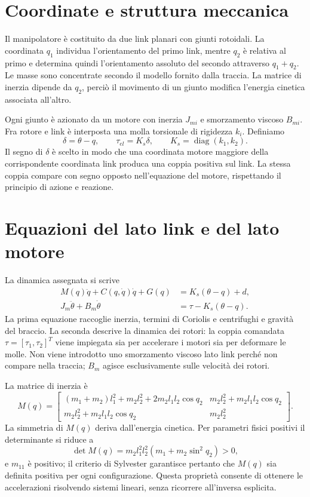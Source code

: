 \documentclass[11pt,a4paper,oneside]{report}
\begin{document}
\section{Coordinate e struttura meccanica}
Il manipolatore è costituito da due link planari con giunti rotoidali. La coordinata $q_1$ individua l'orientamento del primo link, mentre $q_2$ è relativa al primo e determina quindi l'orientamento assoluto del secondo attraverso $q_1+q_2$. Le masse sono concentrate secondo il modello fornito dalla traccia. La matrice di inerzia dipende da $q_2$, perciò il movimento di un giunto modifica l'energia cinetica associata all'altro.

Ogni giunto è azionato da un motore con inerzia $J_{mi}$ e smorzamento viscoso $B_{mi}$. Fra rotore e link è interposta una molla torsionale di rigidezza $k_i$. Definiamo
\[
\delta=\theta-q,\qquad \tau_{el}=K_s\delta,\qquad
K_s=\operatorname{diag}(k_1,k_2).
\]
Il segno di $\delta$ è scelto in modo che una coordinata motore maggiore della corrispondente coordinata link produca una coppia positiva sul link. La stessa coppia compare con segno opposto nell'equazione del motore, rispettando il principio di azione e reazione.

\section{Equazioni del lato link e del lato motore}
La dinamica assegnata si scrive
\begin{align}
M(q)\ddot q+C(q,\dot q)\dot q+G(q)&=K_s(\theta-q)+d,\\
J_m\ddot\theta+B_m\dot\theta&=\tau-K_s(\theta-q).
\end{align}
La prima equazione raccoglie inerzia, termini di Coriolis e centrifughi e gravità del braccio. La seconda descrive la dinamica dei rotori: la coppia comandata $\tau=[\tau_1,\tau_2]^T$ viene impiegata sia per accelerare i motori sia per deformare le molle. Non viene introdotto uno smorzamento viscoso lato link perché non compare nella traccia; $B_m$ agisce esclusivamente sulle velocità dei rotori.

La matrice di inerzia è
\[
M(q)=\begin{bmatrix}
(m_1+m_2)l_1^2+m_2l_2^2+2m_2l_1l_2\cos q_2&m_2l_2^2+m_2l_1l_2\cos q_2\\
m_2l_2^2+m_2l_1l_2\cos q_2&m_2l_2^2
\end{bmatrix}.
\]
La simmetria di $M(q)$ deriva dall'energia cinetica. Per parametri fisici positivi il determinante si riduce a
\[
\det M(q)=m_2l_1^2l_2^2\left(m_1+m_2\sin^2 q_2\right)>0,
\]
e $m_{11}$ è positivo; il criterio di Sylvester garantisce pertanto che $M(q)$ sia definita positiva per ogni configurazione. Questa proprietà consente di ottenere le accelerazioni risolvendo sistemi lineari, senza ricorrere all'inversa esplicita.
\end{document}
